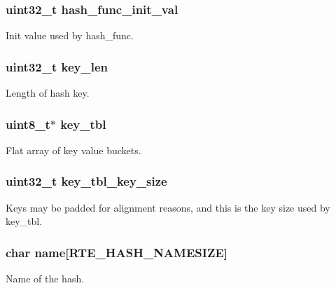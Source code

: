 \subsubsection[{hash\+\_\+func\+\_\+init\+\_\+val}]{\setlength{\rightskip}{0pt plus 5cm}uint32\+\_\+t hash\+\_\+func\+\_\+init\+\_\+val}\label{structrte__hash_a01ac433d404852455c8fb211a4d43b2a}
Init value used by hash\+\_\+func. \hypertarget{structrte__hash_a7250588fe859c80e349c79c2b15ee421}{}
\subsubsection[{key\+\_\+len}]{\setlength{\rightskip}{0pt plus 5cm}uint32\+\_\+t key\+\_\+len}\label{structrte__hash_a7250588fe859c80e349c79c2b15ee421}
Length of hash key. \hypertarget{structrte__hash_ae8f0ffce9df01bf76b73b1e40656598f}{}
\subsubsection[{key\+\_\+tbl}]{\setlength{\rightskip}{0pt plus 5cm}uint8\+\_\+t$\ast$ key\+\_\+tbl}\label{structrte__hash_ae8f0ffce9df01bf76b73b1e40656598f}
Flat array of key value buckets. \hypertarget{structrte__hash_a349faae39ef20968ac3cdc835c18ba00}{}
\subsubsection[{key\+\_\+tbl\+\_\+key\+\_\+size}]{\setlength{\rightskip}{0pt plus 5cm}uint32\+\_\+t key\+\_\+tbl\+\_\+key\+\_\+size}\label{structrte__hash_a349faae39ef20968ac3cdc835c18ba00}
Keys may be padded for alignment reasons, and this is the key size used by key\+\_\+tbl. \hypertarget{structrte__hash_a43ab7746b9b72f04b2e6dadf8365f41b}{}
\subsubsection[{name}]{\setlength{\rightskip}{0pt plus 5cm}char name\mbox{[}{\bf R\+T\+E\+\_\+\+H\+A\+S\+H\+\_\+\+N\+A\+M\+E\+S\+I\+Z\+E}\mbox{]}}\label{structrte__hash_a43ab7746b9b72f04b2e6dadf8365f41b}
Name of the hash. \hypertarget{structrte__hash_aa457ee935be1ba725024ac93fd2b2896}{}

